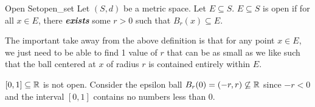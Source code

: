  

\begin{defn}{Open Set}{open_set}
Let \((S, d)\) be a metric space. Let \(E \subseteq S\). 
\newline
\(E \subseteq S\) is open if for all \(x \in E\), there \textbf{\textit{exists}} some \(r > 0\) such that \(B_r(x) \subseteq E\).

\end{defn}
The important take away from the above definition is that for any point \(x \in E\), we just need to be able to find 1 value of \(r\) that can be as small as we like such that the ball centered at \(x\) of radius \(r\) is contained entirely within \(E\). 
\newline

\begin{exmp}{}{}
\([0, 1] \subseteq {\mathbb R}\) is not open. Consider the epsilon ball \(B_r(0) = (-r, r) \not\subseteq {\mathbb R}\) since \(-r < 0\) and the interval \([0, 1]\) contains no numbers less than 0.
\end{exmp}


